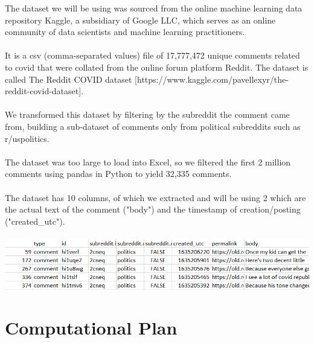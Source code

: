 \documentclass[fontsize=11pt]{article}
\begin{document}
The dataset we will be using was sourced from the online machine learning data repository Kaggle, a subsidiary of Google LLC, which serves as an online community of data scientists and machine learning practitioners.
\\\\
It is a csv (comma-separated values) file of 17,777,472 unique comments related to covid that were collated from the online forum platform Reddit. The dataset is called The Reddit COVID dataset [https://www.kaggle.com/pavellexyr/the-reddit-covid-dataset].
\\\\
We transformed this dataset by filtering by the subreddit the comment came from, building a sub-dataset of comments only from political subreddits such as r/uspolitics.
\\\\
The dataset was too large to load into Excel, so we filtered the first 2 million comments using pandas in Python to yield 32,335 comments.
\\\\
The dataset has 10 columns, of which we extracted and will be using 2 which are the actual text of the comment ("body") and the timestamp of creation/posting ("created\_utc"). \\\\
\includegraphics{rows.png}

\section*{Computational Plan}
\end{document}
